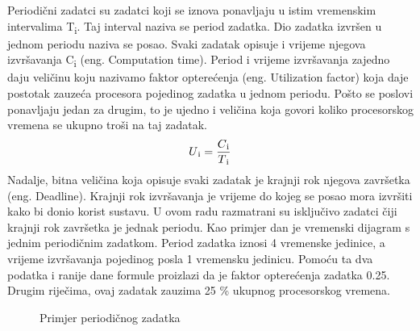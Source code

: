 \documentclass[../zavrsni.tex]{subfiles}
\begin{document}
Periodični zadatci su zadatci koji se iznova ponavljaju u istim vremenskim intervalima T\textsubscript{i}. Taj interval naziva se period zadatka.
Dio zadatka izvršen u jednom periodu naziva se posao.
Svaki zadatak opisuje i vrijeme njegova izvršavanja C\textsubscript{i} (eng. Computation time). Period i vrijeme izvršavanja zajedno daju veličinu 
koju nazivamo faktor opterećenja (eng. Utilization factor) koja daje postotak zauzeća procesora pojedinog zadatka u jednom periodu. Pošto se poslovi
ponavljaju jedan za drugim, to je ujedno i veličina koja govori koliko procesorskog vremena se ukupno troši na taj zadatak.
\begin{equation*}
    U\textsubscript{i} = \frac{C\textsubscript{i}}{T\textsubscript{i}}
\end{equation*}
Nadalje, bitna veličina koja opisuje svaki zadatak je krajnji rok njegova završetka (eng. Deadline). Krajnji rok izvršavanja je vrijeme 
do kojeg se posao mora izvršiti kako bi donio korist sustavu. U ovom radu razmatrani su 
isključivo zadatci čiji krajnji rok završetka je jednak periodu. Kao primjer dan je vremenski dijagram s jednim periodičnim zadatkom.
Period zadatka iznosi 4 vremenske jedinice, a vrijeme izvršavanja pojedinog posla 1 vremensku jedinicu. Pomoću ta dva podatka i ranije 
dane formule proizlazi da je faktor opterećenja zadatka 0.25. Drugim riječima, ovaj zadatak zauzima 25 \% ukupnog procesorskog vremena.

\begin{figure}[h]
    \centering

    \begin{RTGrid}[width=13cm]{1}{20}

  

    \end{RTGrid}

    \caption{Primjer periodičnog zadatka}
    \label{fig:ex1}
  \end{figure}
\end{document}
